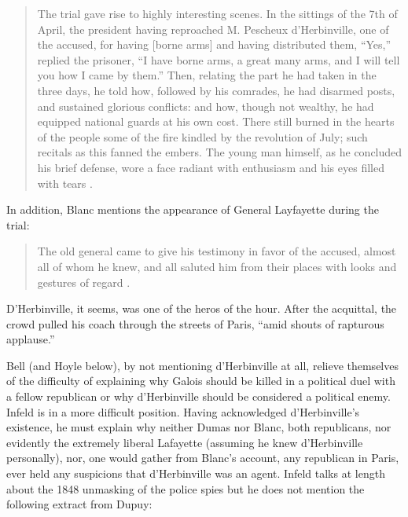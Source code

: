\documentclass[12pt]{article}
\begin{document}
\begin{quote}
The trial gave rise to highly interesting scenes. In the sittings of the 7th of April, the president having reproached M. Pescheux d'Herbinville, one of the accused, for having [borne arms] and having distributed them, ``Yes,'' replied the prisoner, ``I have borne arms, a great many arms, and I will tell you how I came by them.'' Then, relating the part he had taken in the three days, he told how, followed by his comrades, he had disarmed posts, and sustained glorious conflicts: and how, though not wealthy, he had equipped national guards at his own cost. There still burned in the hearts of the people some of the fire kindled by the revolution of July; such recitals as this fanned the embers. The young man himself, as he concluded his brief defense, wore a face radiant with enthusiasm and his eyes filled with tears \cite{83}.
\end{quote}
In addition, Blanc mentions the appearance of General Layfayette during the trial:

\begin{quote}
The old general came to give his testimony in favor of the accused, almost all of whom he knew, and all saluted him from their places with looks and gestures of regard \cite{84}.
\end{quote}
D'Herbinville, it seems, was one of the heros of the hour. After the acquittal, the crowd pulled his coach through the streets of Paris, ``amid shouts of rapturous applause.''

Bell (and Hoyle below), by not mentioning d'Herbinville at all, relieve themselves of the difficulty of explaining why Galois should be killed in a political duel with a fellow republican or why d'Herbinville should be considered a political enemy. Infeld is in a more difficult position. Having acknowledged d'Herbinville's existence, he must explain why neither Dumas nor Blanc, both republicans, nor evidently the extremely liberal Lafayette (assuming he knew d'Herbinville personally), nor, one would gather from Blanc's account, any republican in Paris, ever held any suspicions that d'Herbinville was an agent. Infeld talks at length about the 1848 unmasking of the police spies but he does not mention the following extract from Dupuy:
\end{document}
